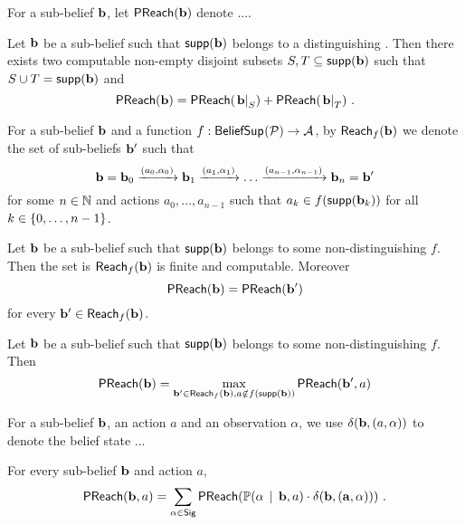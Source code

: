 %
\begin{definition}
For a sub-belief $\mathbf{b}$,
let $\mathsf{PReach}(\mathbf{b})$ denote ....
\end{definition}
%
\begin{lemma}
Let $\mathbf{b}$ be a sub-belief such that $\mathsf{supp}(\mathbf{b})$ belongs to a distinguishing \adscc{}.
Then there exists two computable non-empty disjoint subsets $S,T\subseteq \mathsf{supp}(\mathbf{b})$ such that $S\cup T = \mathsf{supp}(\mathbf{b})$ and
\[
\mathsf{PReach}(\mathbf{b}) =
\mathsf{PReach}(\left.\mathbf{b}\right|_{S}) +
\mathsf{PReach}(\left.\mathbf{b}\right|_{T}) \ .
\]
\end{lemma}
%
\begin{notation}
For a sub-belief $\mathbf{b}$ and a function $f : \mathsf{BeliefSup}_{}(\mathcal{P}) \to \mathcal{A}$,
by $\mathsf{Reach}_{f}(\mathbf{b})$ we denote the set of sub-beliefs $\mathbf{b}'$ such that
\[
\mathbf{b} =
\mathbf{b}_0 \xrightarrow{(a_0,\alpha_0)}
\mathbf{b}_1 \xrightarrow{(a_1,\alpha_1)}
\dots
\xrightarrow{(a_{n-1},\alpha_{n-1})}
\mathbf{b}_n = \mathbf{b}'
\]
for some $n\in\mathbb{N}$ and actions $a_0,\dots,a_{n-1}$ such that $a_k\in f(\mathsf{supp}(\mathbf{b}_k))$ for all $k\in\left\lbrace 0,\dots,n-1\right\rbrace$.
\end{notation}
%
\begin{lemma}
Let $\mathbf{b}$ be a sub-belief such that $\mathsf{supp}(\mathbf{b})$ belongs to some non-distinguishing \adscc{} $f$.
Then the set is $\mathsf{Reach}_{f}(\mathbf{b})$ is finite and computable.
Moreover
\[
\mathsf{PReach}(\mathbf{b}) = \mathsf{PReach}(\mathbf{b}')
\]
for every $\mathbf{b}' \in \mathsf{Reach}_{f}(\mathbf{b})$.
\end{lemma}
%
\begin{lemma}
Let $\mathbf{b}$ be a sub-belief such that $\mathsf{supp}(\mathbf{b})$ belongs to some non-distinguishing \adscc{} $f$.
Then
\[
\mathsf{PReach}(\mathbf{b}) =
\max_{\mathbf{b}'\in\mathsf{Reach}_{f}(\mathbf{b}),
a\notin f(\mathsf{supp}(\mathbf{b}))}
\mathsf{PReach}(\mathbf{b}',a)
\]
\end{lemma}
%
\begin{notation}
For a sub-belief $\mathbf{b}$, an action $a$ and an observation $\alpha$,
we use $\delta(\mathbf{b},(a,\alpha))$ to denote the belief state ... 
\end{notation}
%
\begin{lemma}
For every sub-belief $\mathbf{b}$ and action $a$,
\[
\mathsf{PReach}(\mathbf{b},a) =
\sum_{\alpha\in\mathsf{Sig}}
\mathsf{PReach}(\mathbb{P}(\alpha\, \mid\, \mathbf{b},a)\cdot\mathbf{\delta(\mathbf{b},(a,\alpha))}) \ .
\]
\end{lemma}
%
